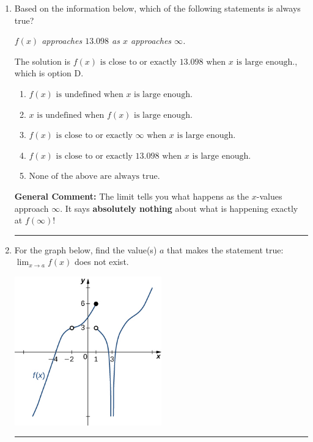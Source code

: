 \documentclass{extbook}[14pt]
\newcommand{\litem}[1]{\item #1

\rule{\textwidth}{0.4pt}}
\begin{document}
\begin{enumerate}\litem{
Based on the information below, which of the following statements is always true?

\begin{center}
    \textit{ $f(x)$ approaches $13.098$ as $x$ approaches $\infty$. }
\end{center}
The solution is \( f(x) \text{ is close to or exactly } 13.098 \text{ when } x \text{ is large enough}. \), which is option D.\begin{enumerate}[label=\Alph*.]
\item \( f(x) \text{ is undefined when } x \text{ is large enough}. \)


\item \( x \text{ is undefined when } f(x) \text{ is large enough}. \)


\item \( f(x) \text{ is close to or exactly } \infty \text{ when } x \text{ is large enough}. \)


\item \( f(x) \text{ is close to or exactly } 13.098 \text{ when } x \text{ is large enough}. \)


\item \( \text{None of the above are always true.} \)


\end{enumerate}

\textbf{General Comment:} The limit tells you what happens as the $x$-values approach $\infty$. It says \textbf{absolutely nothing} about what is happening exactly at $f(\infty)$!
}
\litem{
For the graph below, find the value(s) $a$ that makes the statement true: $ \displaystyle \lim_{x \rightarrow a} f(x)$ does not exist.

\begin{center}
    \includegraphics[width=0.5\textwidth]{../Figures/evaluateLimitGraphicallyCopyA.png}
\end{center}


}
\end{enumerate}
\end{document}
